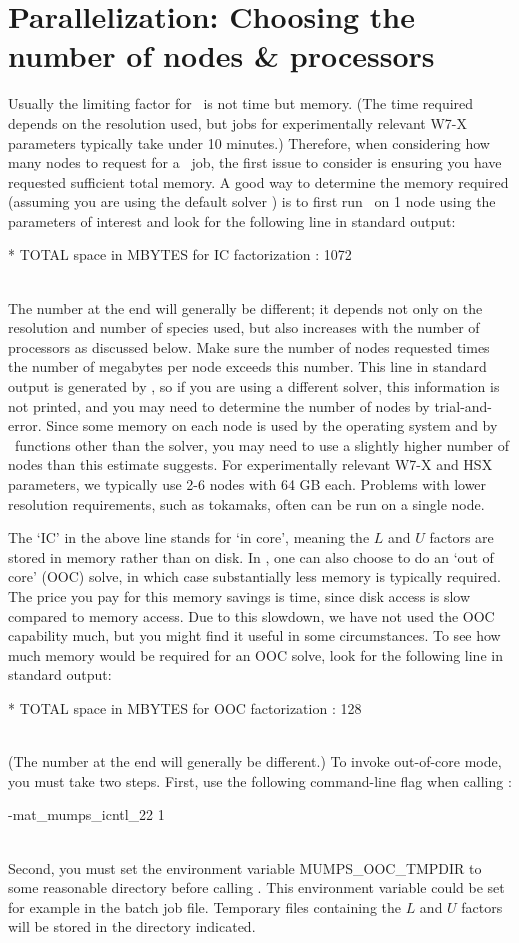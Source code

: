 \section{Parallelization: Choosing the number of nodes \& processors}
\label{sec:parallelization}

Usually the limiting factor for \sfincs~is not time but memory.
(The time required depends on the resolution used, but jobs for experimentally relevant W7-X parameters
typically take under 10 minutes.)
Therefore, when considering how many nodes to request for a \sfincs~job,
the first issue to consider is ensuring you have requested sufficient total memory.
A good way to determine the memory required (assuming you are using the default solver \mumps)
is to first run \sfincs~on 1 node using the parameters of interest
and look for the following line in standard output:\\
\centerline{\ttfamily ** TOTAL     space in MBYTES for IC factorization         :       1072}\\
The number at the end will generally be different; it depends not only on the
resolution and number of species used, but also increases with the number of processors
as discussed below.  Make sure the number of nodes requested times the number of megabytes per node exceeds this number.
This line in standard output is generated by \mumps, so if you are using a different solver, this information is not printed,
and you may need to determine the number of nodes by trial-and-error.
Since some memory on each node is used by the operating system and by \sfincs~functions other than the solver,
you may need to use a slightly higher number of nodes than this estimate suggests.
For experimentally relevant W7-X and HSX parameters, we typically use 2-6 nodes with 64 GB each.
Problems with lower resolution requirements, such as tokamaks, often can be run on a single node.

The `IC' in the above line stands for `in core', meaning the $L$ and $U$ factors are stored
in memory rather than on disk.  In \mumps, one can also choose to do an `out of core' (OOC) solve,
in which case substantially less memory is typically required.  The price you pay for this memory savings is time, since
disk access is slow compared to memory access.  Due to this slowdown, we have not used the OOC capability much, but
you might find it useful in some circumstances.
To see how much memory would be required for an OOC solve,
look for the following line in standard output:\\
\centerline{\ttfamily ** TOTAL     space in MBYTES for OOC factorization        :       128}\\
(The number at the end will generally be different.)
To invoke out-of-core mode, you must take two steps. First, use the following command-line flag when calling \sfincs:\\
\centerline{\ttfamily -mat\_mumps\_icntl\_22 1}\\
Second, you must set the environment variable {\ttfamily MUMPS\_OOC\_TMPDIR} to some reasonable directory
before calling \sfincs. This environment variable could be set for example in the batch job file.
Temporary files containing the $L$ and $U$ factors will be stored in the directory indicated.

